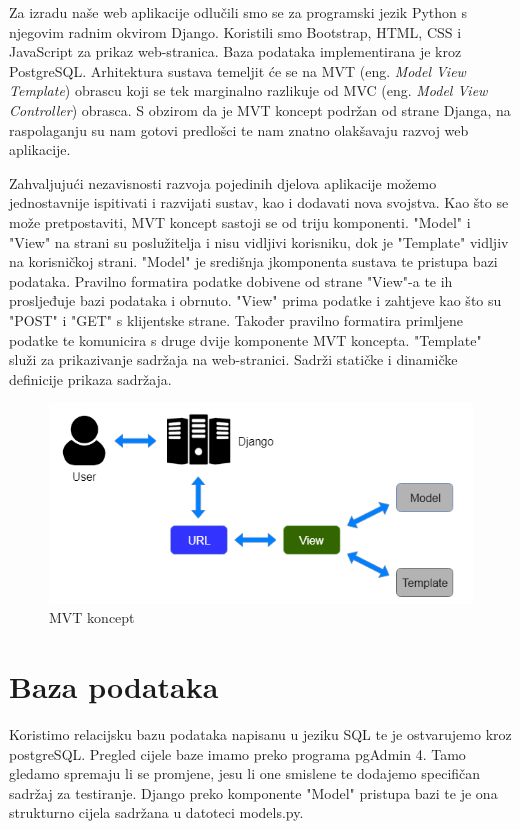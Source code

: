 		Za izradu naše web aplikacije odlučili smo se za programski jezik Python s njegovim radnim okvirom Django. Koristili smo Bootstrap, HTML, CSS i JavaScript za prikaz web-stranica. Baza podataka implementirana je kroz PostgreSQL. Arhitektura sustava temeljit će se na MVT (eng. \textit{Model View Template}) obrascu koji se tek marginalno razlikuje od MVC (eng. \textit{Model View Controller}) obrasca. S obzirom da je MVT koncept podržan od strane Djanga, na raspolaganju su nam gotovi predlošci te nam znatno olakšavaju razvoj web aplikacije.
	
		Zahvaljujući nezavisnosti razvoja pojedinih djelova aplikacije možemo jednostavnije ispitivati i razvijati sustav, kao i dodavati nova svojstva. Kao što se može pretpostaviti, MVT koncept sastoji se od triju komponenti. "Model" i "View" na strani su poslužitelja i nisu vidljivi korisniku, dok je "Template" vidljiv na korisničkoj strani. "Model" je središnja jkomponenta sustava te pristupa bazi podataka. Pravilno formatira podatke dobivene od strane "View"-a te ih prosljeđuje bazi podataka i obrnuto. "View" prima podatke i zahtjeve kao što su "POST" i "GET" s klijentske strane. Također pravilno formatira primljene podatke te komunicira s druge dvije komponente MVT koncepta. "Template" služi za prikazivanje sadržaja na web-stranici. Sadrži statičke i dinamičke definicije prikaza sadržaja.
		
		\begin{figure} [!h] %
			\centering
			\includegraphics[width=0.7\linewidth]{slike/MVT}
			\caption{MVT koncept}
			\label{fig:mvt}
		\end{figure}
		
		\eject		

				
		\section{Baza podataka}
			
		Koristimo relacijsku bazu podataka napisanu u jeziku SQL te je ostvarujemo kroz postgreSQL. Pregled cijele baze imamo preko programa pgAdmin 4. Tamo gledamo spremaju li se promjene, jesu li one smislene te dodajemo specifičan sadržaj za testiranje. Django preko komponente "Model" pristupa bazi te je ona strukturno cijela sadržana u datoteci models.py.
		
